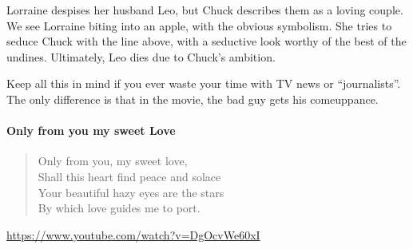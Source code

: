 Lorraine despises her husband Leo, but Chuck describes them as a loving couple. We see Lorraine biting into an apple, with the obvious symbolism. She tries to seduce Chuck with the line above, with a seductive look worthy of the best of the undines. Ultimately, Leo dies due to Chuck's ambition.

Keep all this in mind if you ever waste your time with TV news or ``journalists''. The only difference is that in the movie, the bad guy gets his comeuppance.

\paragraph{Only from you my sweet Love}

\begin{verse}
Only from you, my sweet love,\\
Shall this heart find peace and solace\\
Your beautiful hazy eyes are the stars\\
By which love guides me to port.
\end{verse}

\url{https://www.youtube.com/watch?v=DgOcvWe60xI}


